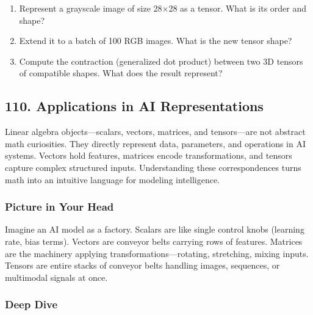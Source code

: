 \documentclass[
  letterpaper,
  DIV=11,
  numbers=noendperiod]{scrreprt}
\providecommand{\tightlist}{%
  \setlength{\itemsep}{0pt}\setlength{\parskip}{0pt}}
\begin{document}
\begin{enumerate}
\def\labelenumi{\arabic{enumi}.}
\tightlist
\item
  Represent a grayscale image of size 28×28 as a tensor. What is its
  order and shape?
\item
  Extend it to a batch of 100 RGB images. What is the new tensor shape?
\item
  Compute the contraction (generalized dot product) between two 3D
  tensors of compatible shapes. What does the result represent?
\end{enumerate}

\subsection{110. Applications in AI
Representations}\label{applications-in-ai-representations}

Linear algebra objects---scalars, vectors, matrices, and tensors---are
not abstract math curiosities. They directly represent data, parameters,
and operations in AI systems. Vectors hold features, matrices encode
transformations, and tensors capture complex structured inputs.
Understanding these correspondences turns math into an intuitive
language for modeling intelligence.

\subsubsection{Picture in Your Head}\label{picture-in-your-head-109}

Imagine an AI model as a factory. Scalars are like single control knobs
(learning rate, bias terms). Vectors are conveyor belts carrying rows of
features. Matrices are the machinery applying
transformations---rotating, stretching, mixing inputs. Tensors are
entire stacks of conveyor belts handling images, sequences, or
multimodal signals at once.

\subsubsection{Deep Dive}\label{deep-dive-109}
\end{document}
